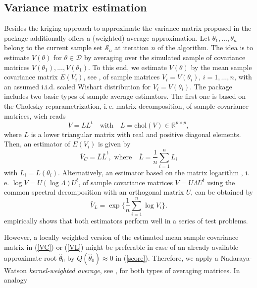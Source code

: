 \documentclass[article, nojss]{jss}
\numberwithin{equation}{section}			%
\newcommand{\R}{\mathbb{R}}
\newcommand{\Sample}{\mathcal{S}}
\newcommand{\D}{\mathcal{D}}
\begin{document}
\subsection{Variance matrix estimation}\label{subsec:varianceInter}
Besides the kriging approach to approximate the variance matrix proposed in
\citet{Baaske2014} the package additionally offers a (weighted) average
approximation. Let $\theta_1,\ldots,\theta_n$ belong to the
current sample set $\Sample_n$ at iteration $n$ of the algorithm. The idea
is to estimate $V(\theta)$ for $\theta\in\D$ by averaging over the	
simulated sample of covariance matrices $V(\theta_1),\ldots,V(\theta_1)$. To this end,
we estimate $V(\theta)$ by the mean sample covariance matrix $E(V_i)$, see
\citet{Dryden2009}, of sample matrices $V_i=V(\theta_i)$, $i=1,\ldots,n$,
with an assumed i.i.d. scaled Wishart distribution for $V_i=V(\theta_i)$. The package includes
two basic types of sample average estimators. The first one is based on the
Cholesky reparametrization, i.\,e. matrix decomposition, of sample covariance
matrices, wich reads
\begin{equation}\label{L}
 V=LL^{t} \quad \textrm{with} \quad L=\textrm{chol}(V)\in\R^{p\times p},
\end{equation}
where $L$ is a lower triangular matrix with real and positive diagonal elements.
Then, an estimator of $E(V_i)$ is given by
\begin{equation}\label{VC}
 \bar{V}_{C} = \bar{L}\bar{L}^t, \textrm{ where} \quad \bar{L} = \frac{1}{n}\sum_{i=1}^n L_i
\end{equation}
with $L_i=L(\theta_i)$.
Alternatively, an estimator based on the matrix logarithm \citep[see,
e.\,g.][]{ref:Golub1996}, i.\,e. \mbox{$\log V=U(\log\Lambda)U^t$}, of sample
covariance matrices $V=U\Lambda U^t$ using the common spectral decomposition with an orthogonal
matrix $U$, can be obtained by
\begin{equation}\label{VL}
 \bar{V}_L = \exp\Bigg\{\frac{1}{n}\sum_{i=1}^n \log V_i \Bigg\}.
\end{equation}
\citet{Dryden2009} empirically shows that both estimators perform well
in a series of test problems.\par
However, a locally weighted version of the estimated mean sample covariance
matrix in (\ref{VC}) or (\ref{VL}) might be preferable in case of an already
available approximate root $\hat{\theta}_0$ by $Q(\hat{\theta}_0)\approx 0$
in (\ref{score}). Therefore, we apply a Nadaraya-Watson \emph{kernel-weighted
average}, see \citet{Qi2007}, for both types of averaging matrices. In analogy
\end{document}
